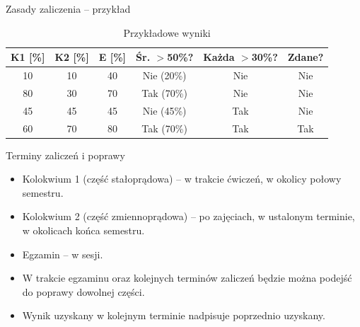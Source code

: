 \begin{frame}{Zasady zaliczenia – przykład}
	\begin{table}
		\centering
		\caption{Przykładowe wyniki}
		\begin{tabular}{|c|c|c|c|c|c|}
			\hline
			K1 [\%] & K2 [\%] & E [\%] & Śr. $>$50\%? & Każda $>$30\%? & Zdane? \\ \hline
			10      & 10      & 40     & Nie (20\%)   & Nie            & Nie    \\ \hline
			80      & 30      & 70     & Tak (70\%)   & Nie            & Nie    \\ \hline
			45      & 45      & 45     & Nie (45\%)   & Tak            & Nie    \\ \hline
			60      & 70      & 80     & Tak (70\%)   & Tak            & Tak    \\ \hline
		\end{tabular}
	\end{table}
\end{frame}

\begin{frame}{Terminy zaliczeń i poprawy}
	\begin{itemize}
		\item[\bt] Kolokwium 1 (część stałoprądowa) – w trakcie ćwiczeń, w okolicy połowy semestru.
		\item[\bt] Kolokwium 2 (część zmiennoprądowa) – po zajęciach, w ustalonym terminie, w okolicach końca semestru.
		\item[\bt] Egzamin – w sesji.
		\item[\bt] W trakcie egzaminu oraz kolejnych terminów zaliczeń będzie można podejść do poprawy dowolnej części.
		\item[\bt] Wynik uzyskany w kolejnym terminie nadpisuje poprzednio uzyskany.
	\end{itemize}
\end{frame}
